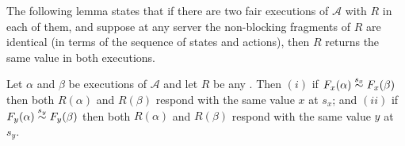 The following lemma states that if there are two fair executions of $\mathcal{A}$ with \rot{} $R$ in each of them, and suppose at any server the non-blocking fragments of $R$ are identical (in terms of the sequence of states and actions), then $R$ returns the same value in both executions.
\begin{lemma}[Indistinguishability]  \label{lem:exec3_equiv}
Let $\alpha$ and $\beta$ be executions of $\mathcal{A}$ and let $R$ be any \rot{}. Then 
$(i)$  if $\frage{F_{x}}{\alpha}{} \stackrel{s_x}{\sim}\frage{F_{x}}{\beta}{}$ then both 
$R(\alpha)$ and $R(\beta)$ respond with the same value $x$ at $s_x$; and 
$(ii)$ if  $\frage{F_{y}}{\alpha}{} \stackrel{s_y}{\sim}\frage{F_{y}}{\beta}{}$ then both 
$R(\alpha)$ and $R(\beta)$ respond with the same value $y$ at $s_y$.
\end{lemma}




